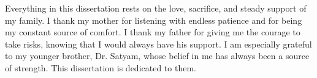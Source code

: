 Everything in this dissertation rests on the love, sacrifice, and steady support of my family. I thank my mother for listening with endless patience and for being my constant source of comfort. I thank my father for giving me the courage to take risks, knowing that I would always have his support. I am especially grateful to my younger brother, Dr. Satyam, whose belief in me has always been a source of strength. This dissertation is dedicated to them.





